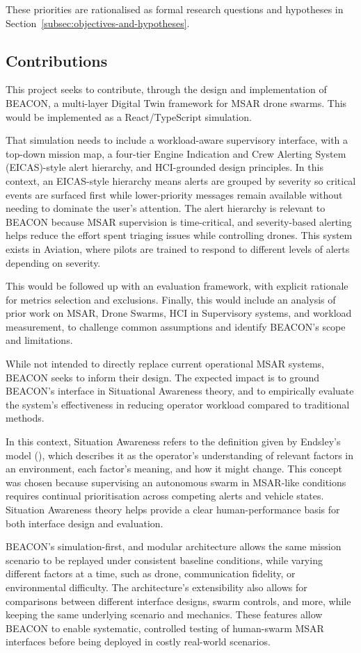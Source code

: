 These priorities are rationalised as formal research questions and hypotheses in Section~\ref{subsec:objectives-and-hypotheses}.

\subsection{Contributions}\label{subsec:contributions}

This project seeks to contribute, through the design and implementation of BEACON, a multi-layer Digital Twin framework for MSAR drone swarms.
This would be implemented as a React/TypeScript simulation.

That simulation needs to include a workload-aware supervisory interface, with a top-down mission map, a four-tier Engine Indication and Crew Alerting System (EICAS)-style alert hierarchy, and HCI-grounded design principles.
In this context, an EICAS-style hierarchy means alerts are grouped by severity so critical events are surfaced first while lower-priority messages remain available without needing to dominate the user's attention.
The alert hierarchy is relevant to BEACON because MSAR supervision is time-critical, and severity-based alerting helps reduce the effort spent triaging issues while controlling drones.
This system exists in Aviation, where pilots are trained to respond to different levels of alerts depending on severity.

This would be followed up with an evaluation framework, with explicit rationale for metrics selection and exclusions.
Finally, this would include an analysis of prior work on MSAR, Drone Swarms, HCI in Supervisory systems, and workload measurement, to challenge common assumptions and identify BEACON's scope and limitations.

While not intended to directly replace current operational MSAR systems, BEACON seeks to inform their design.
The expected impact is to ground BEACON's interface in Situational Awareness theory, and to empirically evaluate the system's effectiveness in reducing operator workload compared to traditional methods.

In this context, Situation Awareness refers to the definition given by Endsley's model (\cite{situation_awareness}), which describes it as the operator's understanding of relevant factors in an environment, each factor's meaning, and how it might change.
This concept was chosen because supervising an autonomous swarm in MSAR-like conditions requires continual prioritisation across competing alerts and vehicle states.
Situation Awareness theory helps provide a clear human-performance basis for both interface design and evaluation.

BEACON's simulation-first, and modular architecture allows the same mission scenario to be replayed under consistent baseline conditions, while varying different factors at a time, such as drone, communication fidelity, or environmental difficulty.
The architecture's extensibility also allows for comparisons between different interface designs, swarm controls, and more, while keeping the same underlying scenario and mechanics.
These features allow BEACON to enable systematic, controlled testing of human-swarm MSAR interfaces before being deployed in costly real-world scenarios.

